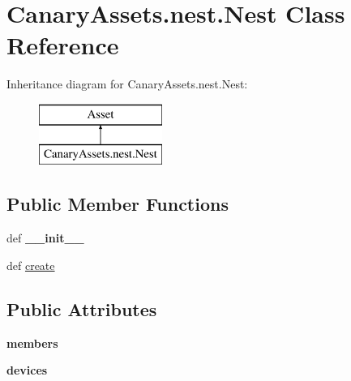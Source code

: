 \hypertarget{class_canary_assets_1_1nest_1_1_nest}{\section{Canary\-Assets.\-nest.\-Nest Class Reference}
\label{class_canary_assets_1_1nest_1_1_nest}
}
Inheritance diagram for Canary\-Assets.\-nest.\-Nest\-:\begin{figure}[H]
\begin{center}
\leavevmode
\includegraphics[height=2.000000cm]{class_canary_assets_1_1nest_1_1_nest}
\end{center}
\end{figure}
\subsection*{Public Member Functions}
\begin{DoxyCompactItemize}
\item 
\hypertarget{class_canary_assets_1_1nest_1_1_nest_ab073f5a4847bd2801c211867d967ba0b}{def {\bfseries \-\_\-\-\_\-init\-\_\-\-\_\-}}\label{class_canary_assets_1_1nest_1_1_nest_ab073f5a4847bd2801c211867d967ba0b}

\item 
def \hyperlink{class_canary_assets_1_1nest_1_1_nest_ac67a952c5e246cc99e71c7aa3dffbb78}{create}
\end{DoxyCompactItemize}
\subsection*{Public Attributes}
\begin{DoxyCompactItemize}
\item 
\hypertarget{class_canary_assets_1_1nest_1_1_nest_af4f64474971707fd8d7b4c123bdc1d25}{{\bfseries members}}\label{class_canary_assets_1_1nest_1_1_nest_af4f64474971707fd8d7b4c123bdc1d25}

\item 
\hypertarget{class_canary_assets_1_1nest_1_1_nest_a36c302666a9289dc3f017a7a5a8c4684}{{\bfseries devices}}\label{class_canary_assets_1_1nest_1_1_nest_a36c302666a9289dc3f017a7a5a8c4684}

\end{DoxyCompactItemize}


